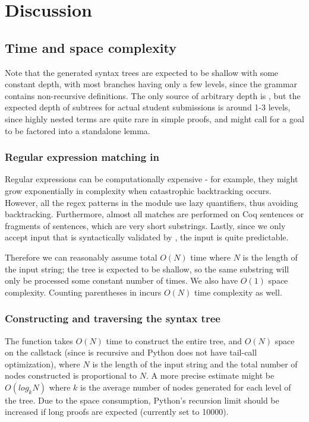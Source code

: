 
\chapter{Discussion} %

\label{dicussion} %


\section{Time and space complexity}
Note that the generated syntax trees are expected to be shallow with some constant depth, with most branches having only a few levels, since the grammar contains non-recursive definitions. The only source of arbitrary depth is , but the expected depth of  subtrees for actual student submissions is around 1-3 levels, since highly nested terms are quite rare in simple proofs, and might call for a goal to be factored into a standalone lemma.

\subsection{Regular expression matching in }
Regular expressions can be computationally expensive - for example, they might grow exponentially in complexity when catastrophic backtracking occurs. However, all the regex patterns in the  module use lazy quantifiers, thus avoiding backtracking. Furthermore, almost all matches are performed on Coq sentences or fragments of sentences, which are very short substrings. Lastly, since we only accept input that is syntactically validated by , the input is quite predictable.

Therefore we can reasonably assume total $O(N)$ time where $ N $ is the length of the input string; the tree is expected to be shallow, so the same substring will only be processed some constant number of times. We also have $ O(1) $ space complexity. Counting parentheses in  incurs $ O(N) $ time complexity as well.

\subsection{Constructing and traversing the syntax tree}
The  function takes $ O(N) $ time to construct the entire tree, and $ O(N) $ space on the callstack (since  is recursive and Python does not have tail-call optimization), where $ N $ is the length of the input string and the total number of nodes constructed is proportional to $ N $. A more precise estimate might be $O(log_kN)$ where $k$ is the average number of nodes generated for each level of the tree. Due to the space consumption, Python's recursion limit should be increased if long proofs are expected (currently set to 10000).

